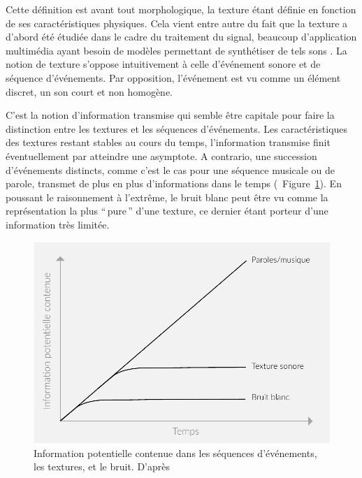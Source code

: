 Cette définition est avant tout morphologique, la texture étant définie en fonction de ses caractéristiques physiques. Cela vient entre autre du fait que la texture a d'abord été étudiée dans le cadre du traitement du signal, beaucoup d'application multimédia ayant besoin de  modèles permettant de synthétiser de tels sons \citep{schwarz2011state}. La notion de texture s'oppose intuitivement à celle d'événement sonore et de séquence d'événements. Par opposition, l'événement est vu comme un élément discret, un son court et non homogène.

C'est la notion d'information transmise qui semble être capitale pour faire la distinction entre les textures et les séquences d'événements.  Les caractéristiques des textures restant stables au cours du temps, l'information transmise finit éventuellement par atteindre une asymptote. A contrario, une succession d'événements distincts, comme c'est le cas pour une séquence musicale ou de parole, transmet de plus en plus d'informations dans le temps (\Cf~Figure~\ref{fig:texture}). En poussant le raisonnement à l’extrême, le bruit blanc peut être vu comme la représentation la plus ``\,pure\,'' d'une texture, ce dernier étant porteur d'une information très limitée.

\begin{figure}[bth]
        \myfloatalign
        \includegraphics[width=\linewidth]{gfx/texture}
        \caption[Information potentielle contenue dans les séquences d'événements, les textures, et le bruit]{Information potentielle contenue dans les séquences d'événements, les textures, et le bruit. D'après \citep{saint1995classification}}\label{fig:texture}
\end{figure}

